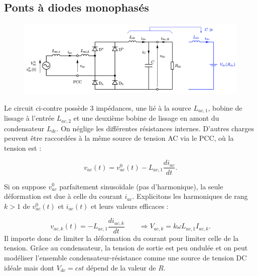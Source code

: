 	\subsection{Ponts à diodes monophasés}
		\begin{figure}
		\vspace{-5mm}
		\includegraphics[scale=0.3]{ch2/14}
		\end{figure} 
		Le circuit ci-contre possède 3 impédances, une lié à la source $L_{ac,1}$, bobine de lissage à l'entrée $L_{ac,2}$ et une deuxième bobine de lissage en amont du condensateur $L_{dc}$. On néglige les différentes résistances internes. D'autres charges peuvent être raccordées à la même source de tension AC via le PCC, où la tension est :
		
		\begin{equation}
			v_{ac}(t) = v_{ac}^0(t) - L_{ac,1}\frac{di_{ac}}{dt}.
		\end{equation}
		
		Si on suppose $v_{ac}^0$ parfaitement sinusoïdale (pas d'harmonique), la seule déformation est due à celle du courant $i_{ac}$. Explicitons les harmoniques de rang $k>1$ de $v_{ac}^0(t)$ et $i_{ac}(t)$ et leurs valeurs efficaces :
		
		\begin{equation}
			v_{ac,k}(t) = -L_{ac,1}\frac{di_{ac,k}}{dt} \qquad \Rightarrow  V_{ac,k} = k\omega L_{ac,1} I_{ac,k}.
		\end{equation}
		Il importe donc de limiter la déformation du courant pour limiter celle de la tension. Grâce au condensateur, la tension de sortie est peu ondulée et on peut modéliser l'ensemble condensateur-résistance comme une source de tension DC idéale mais dont $V_{dc}=cst$ dépend de la valeur de $R$. 
		
